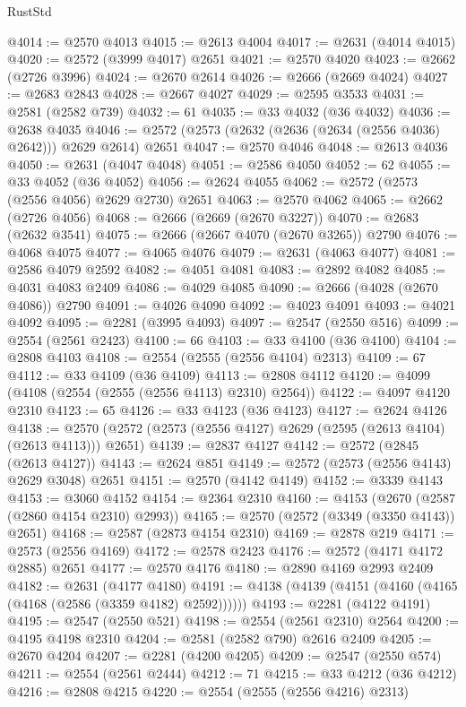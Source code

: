 \begin{lexlean}{RustStd}
\begin{coremodule}
@4014 := @2570 @4013
@4015 := @2613 @4004
@4017 := @2631 (@4014 @4015)
@4020 := @2572 (@3999 @4017) @2651
@4021 := @2570 @4020
@4023 := @2662 (@2726 @3996)
@4024 := @2670 @2614
@4026 := @2666 (@2669 @4024)
@4027 := @2683 @2843
@4028 := @2667 @4027
@4029 := @2595 @3533
@4031 := @2581 (@2582 @739)
@4032 := 61
@4035 := @33 @4032 (@36 @4032)
@4036 := @2638 @4035
@4046 := @2572 (@2573 (@2632 (@2636 (@2634 (@2556 @4036) @2642))) @2629 @2614) @2651
@4047 := @2570 @4046
@4048 := @2613 @4036
@4050 := @2631 (@4047 @4048)
@4051 := @2586 @4050
@4052 := 62
@4055 := @33 @4052 (@36 @4052)
@4056 := @2624 @4055
@4062 := @2572 (@2573 (@2556 @4056) @2629 @2730) @2651
@4063 := @2570 @4062
@4065 := @2662 (@2726 @4056)
@4068 := @2666 (@2669 (@2670 @3227))
@4070 := @2683 (@2632 @3541)
@4075 := @2666 (@2667 @4070 (@2670 @3265)) @2790
@4076 := @4068 @4075
@4077 := @4065 @4076
@4079 := @2631 (@4063 @4077)
@4081 := @2586 @4079 @2592
@4082 := @4051 @4081
@4083 := @2892 @4082
@4085 := @4031 @4083 @2409
@4086 := @4029 @4085
@4090 := @2666 (@4028 (@2670 @4086)) @2790
@4091 := @4026 @4090
@4092 := @4023 @4091
@4093 := @4021 @4092
@4095 := @2281 (@3995 @4093)
@4097 := @2547 (@2550 @516)
@4099 := @2554 (@2561 @2423)
@4100 := 66
@4103 := @33 @4100 (@36 @4100)
@4104 := @2808 @4103
@4108 := @2554 (@2555 (@2556 @4104) @2313)
@4109 := 67
@4112 := @33 @4109 (@36 @4109)
@4113 := @2808 @4112
@4120 := @4099 (@4108 (@2554 (@2555 (@2556 @4113) @2310) @2564))
@4122 := @4097 @4120 @2310
@4123 := 65
@4126 := @33 @4123 (@36 @4123)
@4127 := @2624 @4126
@4138 := @2570 (@2572 (@2573 (@2556 @4127) @2629 (@2595 (@2613 @4104) (@2613 @4113))) @2651)
@4139 := @2837 @4127
@4142 := @2572 (@2845 (@2613 @4127))
@4143 := @2624 @851
@4149 := @2572 (@2573 (@2556 @4143) @2629 @3048) @2651
@4151 := @2570 (@4142 @4149)
@4152 := @3339 @4143
@4153 := @3060 @4152
@4154 := @2364 @2310
@4160 := @4153 (@2670 (@2587 (@2860 @4154 @2310) @2993))
@4165 := @2570 (@2572 (@3349 (@3350 @4143)) @2651)
@4168 := @2587 (@2873 @4154 @2310)
@4169 := @2878 @219
@4171 := @2573 (@2556 @4169)
@4172 := @2578 @2423
@4176 := @2572 (@4171 @4172 @2885) @2651
@4177 := @2570 @4176
@4180 := @2890 @4169 @2993 @2409
@4182 := @2631 (@4177 @4180)
@4191 := @4138 (@4139 (@4151 (@4160 (@4165 (@4168 (@2586 (@3359 @4182) @2592))))))
@4193 := @2281 (@4122 @4191)
@4195 := @2547 (@2550 @521)
@4198 := @2554 (@2561 @2310) @2564
@4200 := @4195 @4198 @2310
@4204 := @2581 (@2582 @790) @2616 @2409
@4205 := @2670 @4204
@4207 := @2281 (@4200 @4205)
@4209 := @2547 (@2550 @574)
@4211 := @2554 (@2561 @2444)
@4212 := 71
@4215 := @33 @4212 (@36 @4212)
@4216 := @2808 @4215
@4220 := @2554 (@2555 (@2556 @4216) @2313)

\end{coremodule}
\end{lexlean}
